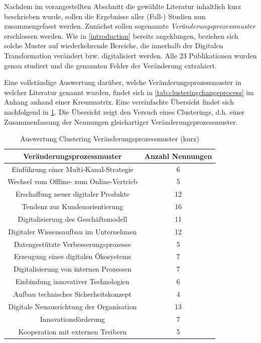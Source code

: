 Nachdem im vorangestellten Abschnitt die  gewählte Literatur inhaltlich kurz  beschrieben wurde, sollen die Ergebnisse aller (Fall-) Studien nun zusammengefasst werden. Zunächst sollen sogenannte \textit{Veränderungsprozessmuster} erschlossen werden. Wie in \ref{introduction} bereits angeklungen, beziehen sich solche Muster auf wiederkehrende Bereiche, die innerhalb der Digitalen Transformation verändert bzw. digitalisiert werden. Alle 23 Publikationen wurden genau studiert  und die genannten Felder der Veränderung extrahiert.

Eine vollständige Auswertung darüber, welche Veränderungsprozessmuster in welcher Literatur genannt wurden, findet sich in \ref{tab:clusteringchangeprocess} im Anhang anhand einer Kreuzmatrix. Eine vereinfachte Übersicht findet sich nachfolgend in \ref{tab:clusteringvpshort}. Die Übersicht zeigt den Versuch eines Clusterings, d.h. einer Zusammenfassung der Nennungen gleichartiger  Veränderungsprozessmuster. 

\begin{table}[ht]
	\centering
	\caption{Auswertung Clustering Veränderungsprozessmuster (kurz)}
	\begin{tabular}{|c|c|}
		\hline
		\textbf{Veränderungsprozessmuster}& \textbf{Anzahl Nennungen} \\
		\hline
		Einführung einer Multi-Kanal-Strategie   & 6  \\
		Wechsel vom Offline- zum Online-Vertrieb & 5  \\
		Erschaffung neuer digitaler Produkte     & 12 \\
		Tendenz zur Kundenorientierung           & 16 \\
		Digitalisierung des Geschäftsmodell      & 11 \\
		Digitaler Wissensaufbau im Unternehmen   & 12 \\
		Datengestützte Verbesserungsprozesse     & 5  \\
		Erzeugung eines digitalen Ökosystems     & 7  \\
		Digitalisierung von internen Prozessen   & 7  \\
		Einbindung innovativer Technologien      & 6  \\
		Aufbau technisches Sicherheitskonzept    & 4  \\
		Digitale Neuausrichtung der Organisation & 13 \\
		Innovationsförderung                     & 7  \\
		Kooperation mit externen Treibern        & 5 \\
		\hline
	\end{tabular}
	\label{tab:clusteringvpshort}
\end{table}

